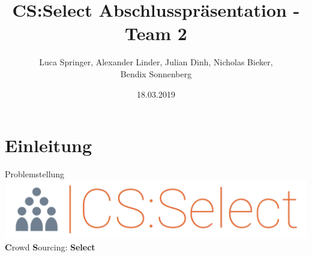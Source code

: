\documentclass[xcolor=dvipsnames]{beamer}
\title[Team 2 - Abschlusspräsentation]{CS:Select Abschlusspräsentation - Team 2}
\author{Luca Springer, Alexander Linder, Julian Dinh, Nicholas Bieker,\\ Bendix Sonnenberg}
\date{18.03.2019}
\begin{document}
    \frame[plain]{\titlepage}

    \section{Einleitung}

    \begin{frame}{Problemstellung}
        \center
        \includegraphics[width=\textwidth / 2]{img/logo.png} \\
        \textbf{C}rowd \textbf{S}ourcing: \textbf{Select}
    \end{frame}
    
\end{document}
